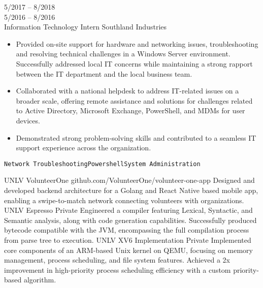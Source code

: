 \documentclass[9pt]{developercv} %
\begin{document}
\begin{entrylist}
	\entry
        {5/2017 -- 8/2018\\5/2016 -- 8/2016\\}
		{Information Technology Intern}
		{Southland Industries}
		{\vspace{-10pt}
        \begin{itemize}[noitemsep,topsep=0pt,parsep=0pt,partopsep=0pt, leftmargin=-1pt]
\item Provided on-site support for hardware and networking issues, troubleshooting and resolving technical challenges in a Windows Server environment. Successfully addressed local IT concerns while maintaining a strong rapport between the IT department and the local business team.
\item Collaborated with a national helpdesk to address IT-related issues on a broader scale, offering remote assistance and solutions for challenges related to Active Directory, Microsoft Exchange, PowerShell, and MDMs for user devices. 
\item Demonstrated strong problem-solving skills and contributed to a seamless IT support experience across the organization.

        \end{itemize} 
        \texttt{Network Troubleshooting}\slashsep \texttt{Powershell}\slashsep\texttt{System Administration}}
\end{entrylist}

\begin{entrylist}
    \entry
		{UNLV}
		{VolunteerOne}
		{github.com/VolunteerOne/volunteer-one-app}
		{Designed and developed backend architecture for a Golang and React Native based mobile app, enabling a swipe-to-match network connecting volunteers with organizations.}
    \entry
		{UNLV}
		{Espresso}
		{Private}
		{Engineered a compiler featuring Lexical, Syntactic, and Semantic analysis, along with code generation capabilities. Successfully produced bytecode compatible with the JVM, encompassing the full compilation process from parse tree to execution.}
	\entry
		{UNLV}
		{XV6 Implementation}
		{Private}
		{Implemented core components of an ARM-based Unix kernel on QEMU, focusing on memory management, process scheduling, and file system features. Achieved a 2x improvement in high-priority process scheduling efficiency with a custom priority-based algorithm.}
\end{entrylist}
\end{document}
